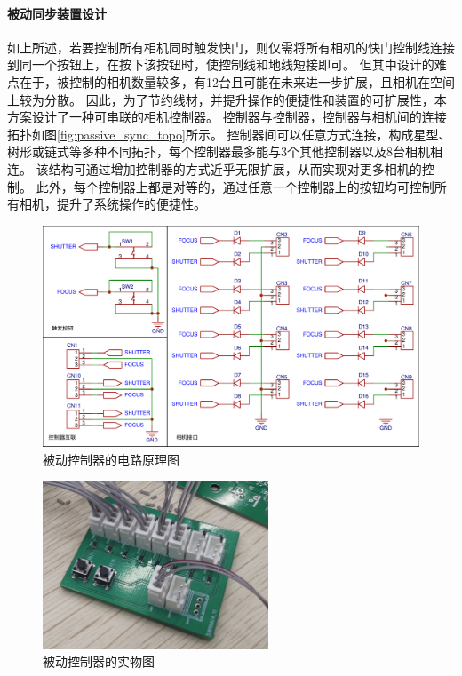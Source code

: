 \paragraph{被动同步装置设计}
如上所述，若要控制所有相机同时触发快门，则仅需将所有相机的快门控制线连接到同一个按钮上，在按下该按钮时，使控制线和地线短接即可。
但其中设计的难点在于，被控制的相机数量较多，有12台且可能在未来进一步扩展，且相机在空间上较为分散。
因此，为了节约线材，并提升操作的便捷性和装置的可扩展性，本方案设计了一种可串联的相机控制器。
控制器与控制器，控制器与相机间的连接拓扑如图\ref{fig:passive_sync_topo}所示。
控制器间可以任意方式连接，构成星型、树形或链式等多种不同拓扑，每个控制器最多能与3个其他控制器以及8台相机相连。
该结构可通过增加控制器的方式近乎无限扩展，从而实现对更多相机的控制。
此外，每个控制器上都是对等的，通过任意一个控制器上的按钮均可控制所有相机，提升了系统操作的便捷性。

\begin{figure}
\includegraphics[width=\textwidth]{figures/passive_sync_schematic}
\caption{被动控制器的电路原理图}
\label{fig:passive_sync_schematic}
\end{figure}

\begin{figure}
\centering
\includegraphics[height=5cm]{figures/passive_sync_controller}
\caption{被动控制器的实物图}
\end{figure}

